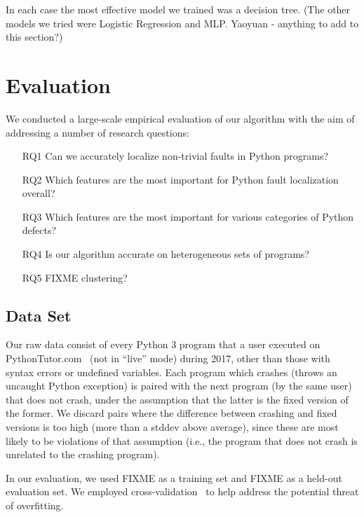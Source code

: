 \documentclass[conference]{IEEEtran}
\begin{document}
In each case the most effective model we trained was a decision tree. (The other
models we tried were Logistic Regression and MLP. Yaoyuan - anything to add to
this section?)

\section{Evaluation}
\label{sec-eval}

We conducted a large-scale empirical evaluation of our algorithm with the
aim of addressing a number of research questions:
\begin{enumerate}

\item[RQ1]{Can we accurately localize non-trivial faults in Python
programs?}

\item[RQ2]{Which features are the most important for Python fault
localization overall?}

\item[RQ3]{Which features are the most important for various categories of
Python defects?}

\item[RQ4]{Is our algorithm accurate on heterogeneous sets of programs?}

\item[RQ5]{FIXME clustering?}

\end{enumerate}

\subsection{Data Set}

Our raw data consist of every Python 3 program that a user executed on
PythonTutor.com~\cite{Guo2013-vu} (not in ``live'' mode) during 2017, other
than those with syntax errors or undefined variables.  Each program which
crashes (throws an uncaught Python exception) is paired with the next
program (by the same user) that does not crash, under the assumption that
the latter is the fixed version of the former. We discard pairs where the
difference between crashing and fixed versions is too high (more than a
stddev above average), since these are most likely to be violations of that
assumption (i.e., the program that does not crash is unrelated to the
crashing program).

In our evaluation, we used FIXME as a training set and FIXME as a held-out
evaluation set. We employed cross-validation~\cite{kohavi} to help address
the potential threat of overfitting.
\end{document}
